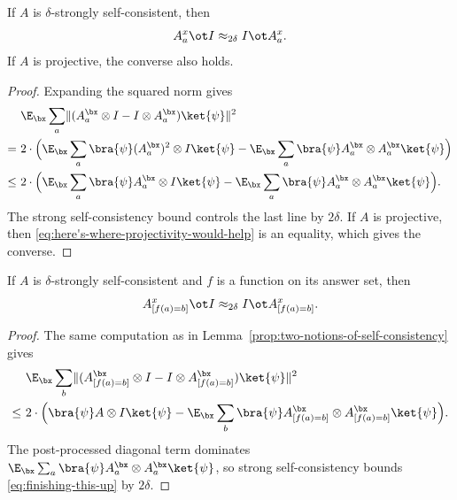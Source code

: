 \begin{lemma}\label{prop:two-notions-of-self-consistency}
	\leanok
	If $A$ is $\delta$-strongly self-consistent, then
	\[
		A_a^x \ot I \approx_{2\delta} I \ot A_a^x.
	\]
	If $A$ is projective, the converse also holds.
\end{lemma}
\begin{proof}
	\leanok
	Expanding the squared norm gives
	\begin{align}
		      & \E_{\bx} \sum_a \lVert(A^{\bx}_a \otimes I - I \otimes A^{\bx}_a)\ket{\psi}\rVert^2 \nonumber                                                                  \\
		=~    & 2\cdot \Big( \E_{\bx} \sum_a \bra{\psi} (A^{\bx}_a)^2 \otimes I \ket{\psi} -  \E_{\bx} \sum_a \bra{\psi} A^{\bx}_a \otimes A^{\bx}_a \ket{\psi}\Big) \nonumber \\
		\leq~ & 2\cdot \Big( \E_{\bx} \sum_a \bra{\psi} A^{\bx}_a \otimes I \ket{\psi} -  \E_{\bx} \sum_a \bra{\psi} A^{\bx}_a \otimes A^{\bx}_a \ket{\psi}\Big).
		\label{eq:here's-where-projectivity-would-help}
	\end{align}
	The strong self-consistency bound controls the last line by $2\delta$. If $A$ is projective, then \eqref{eq:here's-where-projectivity-would-help} is an equality, which gives the converse.
\end{proof}

\begin{lemma}\label{prop:two-notions-of-self-consistency-after-evaluation}
	\leanok
	If $A$ is $\delta$-strongly self-consistent and $f$ is a function on its answer set, then
	\[
		A_{[f(a)=b]}^x \ot I \approx_{2\delta} I \ot A_{[f(a)=b]}^x.
	\]
\end{lemma}
\begin{proof}
	\leanok
	The same computation as in Lemma~\ref{prop:two-notions-of-self-consistency} gives
	\begin{align}
		      & \E_{\bx} \sum_b \lVert(A^{\bx}_{[f(a)=b]} \otimes I - I \otimes A^{\bx}_{[f(a)=b]}) \ket{\psi}\rVert^2 \nonumber                            \\
		\leq~ & 2\cdot \Big( \bra{\psi} A \otimes I \ket{\psi} -  \E_{\bx} \sum_b \bra{\psi} A^{\bx}_{[f(a)=b]} \otimes A^{\bx}_{[f(a)=b]} \ket{\psi}\Big).
		\label{eq:finishing-this-up}
	\end{align}
	The post-processed diagonal term dominates $\E_{\bx} \sum_a \bra{\psi} A^\bx_a \otimes A^\bx_a \ket{\psi}$, so strong self-consistency bounds \eqref{eq:finishing-this-up} by $2\delta$.
\end{proof}

